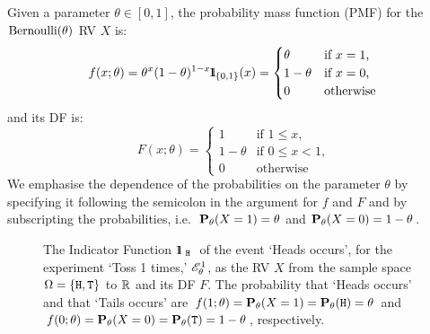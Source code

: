 \begin{model}[$\bernoulli(\theta)$]
Given a parameter $\theta \in [0,1]$, the probability mass function (PMF) for the $\bernoulli(\theta)$ RV $X$ is:
\begin{equation}\label{E:Bernoullipdf}
f(x;\theta)= \theta^x (1-\theta)^{1-x} {1}\mspace{-11 mu}{1}_{\{0,1\}}(x) =
\begin{cases}
\theta & \text{if $x=1$,}\\
1-\theta & \text{if $x=0$,}\\
0 & \text{otherwise}
\end{cases}
\end{equation}
and its DF is:
\begin{equation}
F(x;\theta) =
\begin{cases}
1 & \text{if $1 \leq x$,}\\
1-\theta & \text{if $0 \leq x < 1$,}\\
0 & \text{otherwise}
\end{cases}
\end{equation}
We emphasise the dependence of the probabilities on the parameter $\theta$ by specifying it following the semicolon in the argument for $f$ and $F$ and by subscripting the probabilities, i.e.~$\mathbf{P}_{\theta}(X=1)=\theta$ and $\mathbf{P}_{\theta}(X=0)=1-\theta$.
\end{model}
\begin{figure}[htpb]
\caption{The Indicator Function $\BB{1}_{ \ {\tt H} \ }$ of the event `Heads occurs', for the experiment `Toss 1 times,' $\mathscr{E}_{\theta}^{1}$, as the RV $X$ from the sample space $\Omega = \{ {\tt H}, {\tt T}\}$ to $\mathbb{R}$ and its DF $F$.  The probability that `Heads occurs' and that `Tails occurs' are $f(1;\theta)=\mathbf{P}_{\theta}(X=1) = \mathbf{P}_{\theta}({\tt H})=\theta$ and $f(0;\theta)=\mathbf{P}_{\theta}(X=0)=\mathbf{P}_{\theta}({\tt T})=1-\theta$, respectively.\label{F:RVt1T}}
\centering   {}
\end{figure}

